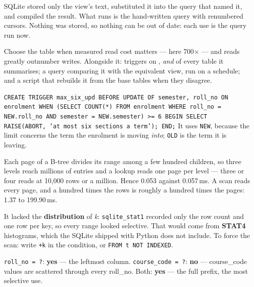\begin{ans}
  \item SQLite stored only the view's  text, substituted it into
        the query that named it, and compiled the result. What runs is the
        hand-written query with renumbered cursors. Nothing was stored, so
        nothing can be out of date: each use is the query run now.
  \item Choose the table when measured read cost matters --- here 700$\times$
        --- and reads greatly outnumber writes. Alongside it: triggers on
        ,  \emph{and}  of every
        table it summarises; a query comparing it with the equivalent view,
        run on a schedule; and a script that rebuilds it from the base tables
        when they disagree.
  \item \texttt{CREATE TRIGGER max\_six\_upd BEFORE UPDATE OF semester,
        roll\_no ON enrolment WHEN (SELECT COUNT(*) FROM enrolment WHERE
        roll\_no = NEW.roll\_no AND semester = NEW.semester) >= 6 BEGIN SELECT
        RAISE(ABORT, 'at most six sections a term'); END;} It uses \texttt{NEW},
        because the limit concerns the term the enrolment is moving
        \emph{into}; \texttt{OLD} is the term it is leaving.
\end{ans}

\begin{ans}
  \item Each page of a B-tree divides its range among a few hundred children,
        so three levels reach millions of entries and a lookup reads one page
        per level --- three or four reads at 10{,}000 rows or a million.
        Hence 0.053 against 0.057\,ms. A scan reads every page, and a hundred
        times the rows is roughly a hundred times the pages: 1.37 to
        199.90\,ms.
  \item It lacked the \textbf{distribution} of \textit{k}: \texttt{sqlite\_stat1}
        recorded only the row count and one row per key, so every range looked
        selective. That would come from \textbf{STAT4} histograms, which the
        SQLite shipped with Python does not include. To force the scan: write
        \texttt{+k} in the condition, or \texttt{FROM t NOT INDEXED}.
  \item \texttt{roll\_no = ?}: \textbf{yes} --- the leftmost column.
        \texttt{course\_code = ?}: \textbf{no} --- course\_code values are
        scattered through every roll\_no. Both: \textbf{yes} --- the full
        prefix, the most selective use.
\end{ans}

